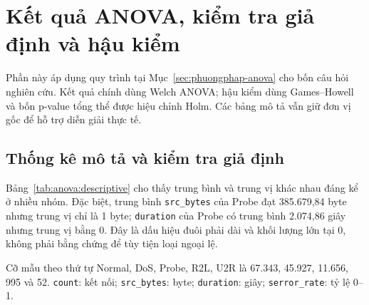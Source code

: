 \section{Kết quả ANOVA, kiểm tra giả định và hậu kiểm}
\label{sec:ketqua-anova}

Phần này áp dụng quy trình tại Mục~\ref{sec:phuongphap-anova} cho bốn câu hỏi nghiên
cứu. Kết quả chính dùng Welch ANOVA; hậu kiểm dùng Games--Howell và bốn p-value tổng thể
được hiệu chỉnh Holm. Các bảng mô tả vẫn giữ đơn vị gốc để hỗ trợ diễn giải thực tế.

\subsection{Thống kê mô tả và kiểm tra giả định}

Bảng~\ref{tab:anova:descriptive} cho thấy trung bình và trung vị khác nhau đáng kể ở
nhiều nhóm. Đặc biệt, trung bình \texttt{src\_bytes} của Probe đạt 385.679,84 byte nhưng
trung vị chỉ là 1 byte; \texttt{duration} của Probe có trung bình 2.074,86 giây nhưng
trung vị bằng 0. Đây là dấu hiệu đuôi phải dài và khối lượng lớn tại 0, không phải bằng
chứng để tùy tiện loại ngoại lệ.

\begin{table}[H]
\centering
\caption{Trung bình và trung vị theo nhóm trên thang gốc}
\label{tab:anova:descriptive}
\scriptsize
\setlength{\tabcolsep}{3pt}
\par\smallskip
\footnotesize Cỡ mẫu theo thứ tự Normal, DoS, Probe, R2L, U2R là 67.343, 45.927,
11.656, 995 và 52. \texttt{count}: kết nối; \texttt{src\_bytes}: byte;
\texttt{duration}: giây; \texttt{serror\_rate}: tỷ lệ 0--1.
\end{table}

